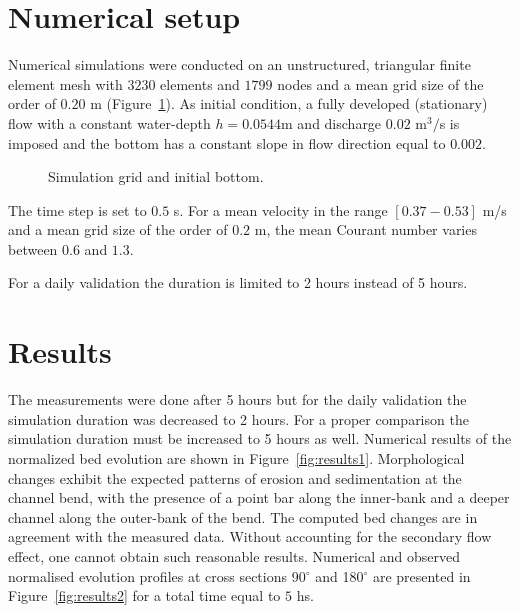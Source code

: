 %
%
\section{Numerical setup}
%
Numerical simulations were conducted on an unstructured, triangular finite element mesh with
$3230$ elements and $1799$ nodes and a mean grid size of the order of $0.20$ m (Figure~\ref{fig:mesh}).
As initial condition, a fully developed (stationary) flow with a constant water-depth $h = 0.0544$m and discharge $0.02$ m$^3/$s is imposed and the bottom has a constant slope in flow direction equal to $0.002$.

\begin{figure} [!h]
\centering
{}
 \caption{Simulation grid and initial bottom.}\label{fig:mesh}
\end{figure}

The time step is set to $0.5$ s. For a mean velocity in the range $[0.37-0.53]$ m/s and
a mean grid size of the order of $0.2$ m, the mean Courant number varies between $0.6$ and $1.3$.

For a daily validation the duration is limited to 2 hours instead of 5 hours.

\section{Results}
%
The measurements were done after 5 hours but for the daily validation the simulation duration was decreased to 2 hours. For a proper comparison the simulation duration must be increased to 5 hours as well. 
Numerical results of the normalized bed evolution are shown in Figure~\ref{fig:results1}. Morphological changes exhibit the expected
patterns of erosion and sedimentation at the channel bend, with the presence of a point bar along the inner-bank and a deeper channel along the outer-bank of the bend.
The computed bed changes are in agreement with the measured data. Without accounting for the secondary flow effect, one cannot obtain such reasonable results.
Numerical and observed normalised evolution profiles at cross sections 90$^{\circ}$ and 180$^{\circ}$ are presented in Figure~\ref{fig:results2} for a total time equal to $5$ hs.


